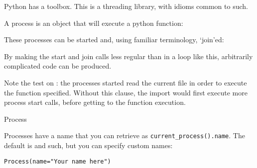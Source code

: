 
\lstset{language=Python}

Python has a  toolbox.
This is a threading library, with idioms common to such.

A process is an object that will execute a python function:

These processes can be started and,
using familiar terminology,
`join'ed:

By making the start and join calls less regular than
in a loop like this,
arbitrarily complicated code can be produced.

Note the test on :
the processes started read the current file in order to execute
the function specified.
Without this clause, the import would first execute more process start calls,
before getting to the function execution.

 {Process}

Processes have a name that you can retrieve as
\lstinline+current_process().name+.
The default is  and such,
but you can specify custom names:
\begin{lstlisting}
Process(name="Your name here")
\end{lstlisting}
